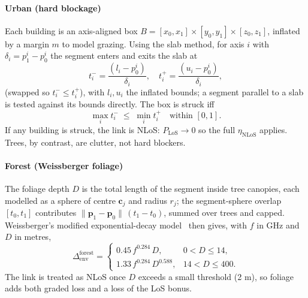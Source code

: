 \documentclass[conference]{IEEEtran}
\begin{document}
\paragraph{Urban (hard blockage)}
Each building is an axis-aligned box $B=[x_0,x_1]\times[y_0,y_1]\times[z_0,z_1]$,
inflated by a margin $m$ to model grazing. Using the slab method, for axis $i$ with
$\delta_i = p_1^i-p_0^i$ the segment enters and exits the slab at
\begin{equation}
t_i^{-}=\frac{(l_i-p_0^i)}{\delta_i},\quad t_i^{+}=\frac{(u_i-p_0^i)}{\delta_i},
\end{equation}
(swapped so $t_i^{-}\!\le t_i^{+}$), with $l_i,u_i$ the inflated bounds; a segment
parallel to a slab is tested against its bounds directly. The box is struck iff
\begin{equation}
\max_i t_i^{-} \;\le\; \min_i t_i^{+}\quad\text{within } [0,1].
\end{equation}
If any building is struck, the link is NLoS: $P_{\mathrm{LoS}}\!\to\!0$ so the full
$\eta_{\mathrm{NLoS}}$ applies. Trees, by contrast, are clutter, not hard blockers.

\paragraph{Forest (Weissberger foliage)}
The foliage depth $D$ is the total length of the segment inside tree canopies, each
modelled as a sphere of centre $\mathbf{c}_j$ and radius $r_j$; the segment-sphere
overlap $[t_0,t_1]$ contributes $\lVert\mathbf{p}_1-\mathbf{p}_0\rVert\,(t_1-t_0)$,
summed over trees and capped. Weissberger's modified exponential-decay
model~\cite{weissberger1982} then gives, with $f$ in GHz and $D$ in metres,
\begin{equation}
\Delta_{\mathrm{env}}^{\mathrm{forest}} =
\begin{cases}
0.45\, f^{0.284}\, D, & 0 < D \le 14,\\[2pt]
1.33\, f^{0.284}\, D^{0.588}, & 14 < D \le 400.
\end{cases}
\end{equation}
The link is treated as NLoS once $D$ exceeds a small threshold (2 m), so foliage adds
both graded loss and a loss of the LoS bonus.
\end{document}
